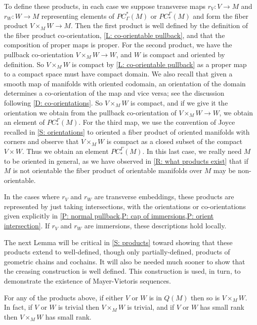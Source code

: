 To define these products, in each case we suppose transverse maps $r_V \colon V \to M$ and $r_W \colon W \to M$ representing elements of
$PC^*_\Gamma(M)$ or $PC_*^\Gamma(M)$ and form the fiber product $V \times_M W \to M$.
Then the first product is well defined by the definition of the fiber product co-orientation, \cref{L: co-orientable pullback}, and that the composition of proper maps is proper.
For the second product, we have the pullback co-orientation $V \times_M W \to W$, and $W$ is compact and oriented by definition.
So $V \times_M W$ is compact by \cref{L: co-orientable pullback} as a proper map to a compact space must have compact domain.
We also recall that given a smooth map of manifolds with oriented codomain, an orientation of the domain determines a co-orientation of the map and vice versa; see the discussion following \cref{D: co-orientations}.
So $V \times_M W$ is compact, and if we give it the orientation we obtain from the pullback co-orientation of $V \times_M W \to W$, we obtain an element of $PC_*^\Gamma(M)$.
For the third map, we use the convention of Joyce recalled in \cref{S: orientations} to oriented a fiber product of oriented manifolds with corners and observe that $V \times_M W$ is compact as a closed subset of the compact $V \times W$.
Thus we obtain an element $PC_*^\Gamma(M)$.
In this last case, we really need $M$ to be oriented in general, as we have observed in \cref{R: what products exist} that if $M$ is not orientable the fiber product of orientable manifolds over $M$ may be non-orientable.

In the cases where $r_V$ and $r_W$ are transverse embeddings, these products are represented by just taking intersections, with the orientations or co-orientations given explicitly in \cref{P: normal pullback,P: cap of immersions,P: orient intersection}.
If $r_V$ and $r_W$ are immersions, these descriptions hold locally.

The next Lemma will be critical in \cref{S: products} toward showing that these products extend to well-defined, though only partially-defined, products of geometric chains and cochains.
It will also be needed much sooner to show that the creasing construction is well defined.
This construction is used, in turn, to demonstrate the existence of Mayer-Vietoris sequences.

\begin{lemma}\label{L: pullback with Q}
	For any of the products above, if either $V$ or $W$ is in $Q(M)$ then so is $V \times_M W$.
	In fact, if $V$ or $W$ is trivial then $V \times_M W$ is trivial, and if $V$ or $W$ has small rank then $V \times_M W$ has small rank.
\end{lemma}

